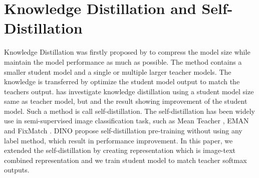 \section{Knowledge Distillation and Self-Distillation}
Knowledge Distillation was firstly proposed by  to compress the model size while maintain the model performance as much as possible. The method contains a smaller student model and a single or multiple larger teacher models. The knowledge is transferred by optimize the student model output to match the teachers output.  has investigate knowledge distillation using a student model size same as teacher model, but and the result showing improvement of the student model. Such a method is call self-distillation. The self-distillation has been widely use in semi-supervised image classification task, such as Mean Teacher , EMAN  and  FixMatch . DINO  propose self-distillation pre-training without using any label method, which result in performance improvement. In this paper, we extended the self-distillation by creating representation which is image-text combined representation and we train student model to match teacher softmax outputs.


